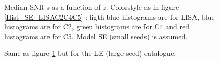 \documentclass{iopart}
\begin{document}


\begin{figure}
\caption{Median SNR s as a function of  $z$. Colorstyle as in figure \ref{Hist_SE_LISAC2C4C5} : ligth blue histograms are for LISA, blue histograms are for C2, green histograms are for C4 and red histograms are for C5. Model SE (small seeds) is assumed.
\label{MedianSNR_SE_LISAC2C4C5} } 
\end{figure}

\begin{figure}
\caption{Same as figure \ref{MedianSNR_SE_LISAC2C4C5} but for the LE (large seed) catalogue.
\label{MedianSNR_LE_LISAC2C4C5} } 
\end{figure}
\end{document}
